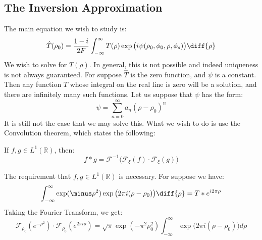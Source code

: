 \documentclass[crop=false,class=book,oneside]{standalone}
\begin{document}
        \subsection{The Inversion Approximation}
            The main equation we wish to study is:
            \begin{equation}
            \hat{T}(\rho_0)=
            \frac{1-i}{2F}\int_{-\infty}^{\infty}T(\rho)
            \exp\big(i\psi(\rho_{0},\phi_{0},\rho,\phi_{s})\big)
                \diff{\rho}
            \end{equation}
            We wish to solve for $T(\rho)$. In general, this is not
            possible and indeed uniqueness is not always guaranteed.
            For suppose $\hat{T}$ is the zero function, and
            $\psi$ is a constant. Then any function $T$ whose
            integral on the real line is zero will be a solution,
            and there are infinitely many such functions.
            Let us suppose that $\psi$ has the form:
            \begin{equation}
                \psi=\sum_{n=0}^{\infty}a_{n}(\rho-\rho_{0})^{n}
            \end{equation}
            It is still not the case that we may solve this. What
            we wish to do is use the Convolution theorem, which
            states the following:
            \begin{theorem}
                If $f,g\in L^{1}(\mathbb{R})$, then:
                \begin{equation}
                    f*g=\mathcal{F}^{-1}\big(
                        \mathcal{F}_{\xi}(f)\cdot
                        \mathcal{F}_{\xi}(g)
                    \big)
                \end{equation}
            \end{theorem}
            The requirement that $f,g\in L^{1}(\mathbb{R})$ is
            necessary. For suppose we have:
            \begin{equation}
                \int_{-\infty}^{\infty}
                    \exp(\minus\rho^{2})
                    \exp\big(2\pi{i}(\rho-\rho_{0})\big)\diff{\rho}
                    =T*e^{i2\pi\rho}    
            \end{equation}
            Taking the Fourier Transform, we get:
            \begin{equation}
                \mathcal{F}_{\rho_0}(e^{\minus\rho^{2}})\cdot
                \mathcal{F}_{\rho_0}(e^{2\pi i \rho})
                =\sqrt{\pi}\exp(\minus\pi^{2}\rho_0^{2})
                    \int_{-\infty}^{\infty}
                    \exp\big(2\pi{i}(\rho-\rho_{0})\big)d\rho
            \end{equation}
\end{document}
